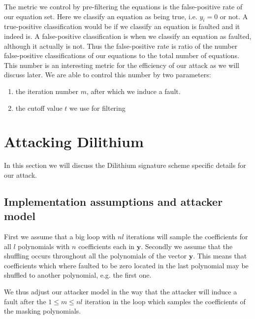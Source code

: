 

The metric we control by pre-filtering the equations is
the false-positive rate of our equation set. Here we classify an equation as being true, i.e. $y_{i} = 0$ or not. A true-positive classification would be if we classify an equation is faulted and it indeed is. A false-positive classification is when we classify an equation as faulted, although it actually is not. Thus the false-positive rate is ratio of the number false-positive classifications of our equations to the total number of equations. This number is an interesting metric for the efficiency of our attack as we will discuss later.
We are able to control this number by two parameters:
\begin{enumerate}
	\item the iteration number $m$, after which we induce a fault.
	\item the cutoff value $t$ we use for filtering
\end{enumerate}







\section{Attacking Dilithium}
\label{sec:attackdilithium}

In this section we will discuss the Dilithium signature scheme specific details for our attack.

\subsection{Implementation assumptions and attacker model}
First we assume that a big loop with $nl$ iterations will sample the coefficients for all $l$ polynomials with $n$ coefficients each in $\bm{y}$. Secondly we assume that the shuffling occurs throughout all the polynomials of the vector $\bm{y}$. This means that coefficients which where faulted to be zero located in the last polynomial may be shuffled to another polynomial, e.g. the first one.

We thus adjust our attacker model in the way that the attacker will induce a fault after the $1 \leq m \leq nl$ iteration in the loop which samples the coefficients of the masking polynomials.

